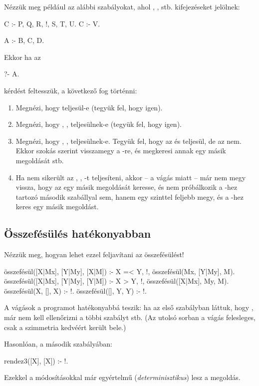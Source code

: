 Nézzük meg például az alábbi szabályokat, ahol
, ,  stb. kifejezéseket jelölnek:
\begin{program}
C :- P, Q, R, !, S, T, U.
C :- V.

A :- B, C, D.
\end{program}

Ekkor ha az
\begin{query}
?- A.
\end{query}
kérdést feltesszük, a következő fog történni:
\begin{enumerate}
\item Megnézi, hogy  teljesül-e (tegyük fel,
  hogy igen).
\item Megnézi, hogy , , 
  teljesülnek-e (tegyük fel, hogy igen).
\item Megnézi, hogy , , 
  teljesülnek-e. Tegyük fel, hogy az  és
   teljesül, de az  nem. Ekkor szokás
  szerint visszamegy a -re, és megkeresi annak
  egy másik megoldását stb.
\item Ha nem sikerült az , , -t
  teljesíteni, akkor -- a vágás miatt -- már nem
  megy vissza, hogy az  egy másik megoldását
  keresse, és nem próbálkozik a -hez tartozó
  második szabállyal sem, hanem egy szinttel feljebb
  megy, és a -hez keres egy másik megoldást.
\end{enumerate}

\subsection*{Összefésülés hatékonyabban}
Nézzük meg, hogyan lehet ezzel feljavítani az összefésülést!
\begin{program}
összefésül([X|Mx], [Y|My], [X|M]) :-
    X =< Y, !, összefésül(Mx, [Y|My], M).
összefésül([X|Mx], [Y|My], [Y|M]) :-
    X > Y, !, összefésül([X|Mx], My, M).
összefésül(X, [], X) :- !.
összefésül([], Y, Y) :- !.
\end{program}

A vágások a programot hatékonyabbá teszik: ha az
első szabályban láttuk, hogy , már nem
kell ellenőrizni a többi szabályt stb. (Az utolsó
sorban a vágás felesleges, csak a szimmetria
kedvéért került bele.)

Hasonlóan, a  második szabályában:
\begin{program}
rendez3([X], [X]) :- !.
\end{program}
Ezekkel a módosításokkal már egyértelmű
(\emph{determinisztikus}) lesz a megoldás.

